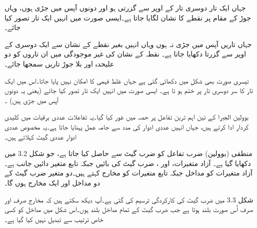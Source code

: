   جہاں ایک تار دوسری تار کے   اوپر سے گزرتی ہو  اور  دونوں آپس میں  جڑی ہوں،   وہاں  جوڑ کے مقام پر نقطے  کا نشان لگایا جاتا ہے۔ایسی صورت میں انہیں ایک  تار تصور کیا جائے۔
  
   جہاں تاریں  آپس میں جڑی نہ ہوں وہاں انہیں بغیر نقطے کے نشان سے   ایک دوسری کے اوپر سے گزرتا دکھایا جاتا ہے۔ نقطہ کے نشان کی غیر موجودگی میں ان تاروں کو دو علیحدہ اور بلا جوڑ  تاریں سمجھا جائے۔

 تیسری صورت بھی شکل میں دکھائی گئی ہے جہاں غلط فہمی کا  امکان نہیں پایا جاتا۔اس میں ایک تار کا سر دوسری تار پر ختم ہو تا ہے۔ ایسی صورت میں انہیں ایک  تار تصور کیا جائے  (یعنی یہ دونوں آپس میں جڑی ہیں) ۔
\begin{center}
\quad\quad
{}\quad \quad 
{}
\end{center}

 بوولین الجبرا کے تین اہم ترین تفاعل پر حصہ  میں  غور  کیا گیا۔یہ  تفاعلات  عددی  برقیات  میں کلیدی کردار ادا کرتے ہیں، جہاں انہیں  عددی ادوار کی مدد سے جامہ عمل  پہنایا  جاتا ہے۔یہ مخصوص عددی ادوار عددی گیٹ  کہلاتے ہیں۔
 
	منطقی (بوولین)  ضرب   تفاعل کو   ضرب گیٹ سے حاصل کیا جاتا ہے،  جو شکل 3.2 میں دکھایا گیا ہے۔ آزاد متغیرات،    اور ،   ضرب گیٹ کی  بائیں  جبکہ تابع متغیر دائیں جانب  ہے۔  آزاد متغیرات کو مداخل  جبکہ تابع متغیرات کو مخارج کہتے ہیں۔دو متغیر  ضرب گیٹ کے دو مداخل اور ایک مخارج ہوں  گا۔

شکل 3.3 میں ضرب گیٹ کی کارکردگی  ترسیم  کی گئی ہے۔آپ دیکھ سکتے ہیں کہ مخارج صرف اور صرف اُس صورت بلند  ہوتا ہے جب ضرب گیٹ کے تمام مداخل بلند ہوں۔اس شکل میں  مداخل کو کسی خاص ترتیب سے  تبدیل نہیں  کیا گیا ہے۔

